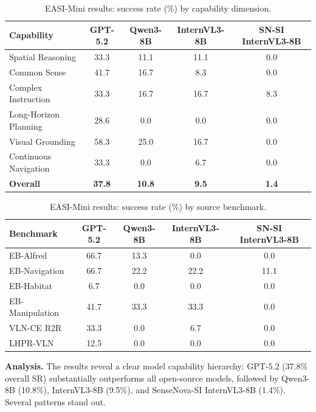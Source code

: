 \documentclass[
hf,
]{confart}
\begin{document}
\begin{table}[htbp]
\centering
\caption{EASI-Mini results: success rate (\%) by capability dimension.}
\label{tab:easimini_capability}
\renewcommand{\arraystretch}{1.1}
\begin{tabular}{lcccc}
\toprule
\textbf{Capability} & \textbf{GPT-5.2} & \textbf{Qwen3-8B} & \textbf{InternVL3-8B} & \textbf{SN-SI InternVL3-8B} \\
\midrule
Spatial Reasoning & 33.3 & 11.1 & 11.1 & 0.0 \\
Common Sense & 41.7 & 16.7 & 8.3 & 0.0 \\
Complex Instruction & 33.3 & 16.7 & 16.7 & 8.3 \\
Long-Horizon Planning & 28.6 & 0.0 & 0.0 & 0.0 \\
Visual Grounding & 58.3 & 25.0 & 16.7 & 0.0 \\
Continuous Navigation & 33.3 & 0.0 & 6.7 & 0.0 \\
\midrule
\textbf{Overall} & \textbf{37.8} & \textbf{10.8} & \textbf{9.5} & \textbf{1.4} \\
\bottomrule
\end{tabular}
\end{table}

\begin{table}[htbp]
\centering
\caption{EASI-Mini results: success rate (\%) by source benchmark.}
\label{tab:easimini_benchmark}
\renewcommand{\arraystretch}{1.1}
\begin{tabular}{lcccc}
\toprule
\textbf{Benchmark} & \textbf{GPT-5.2} & \textbf{Qwen3-8B} & \textbf{InternVL3-8B} & \textbf{SN-SI InternVL3-8B} \\
\midrule
EB-Alfred & 66.7 & 13.3 & 0.0 & 0.0 \\
EB-Navigation & 66.7 & 22.2 & 22.2 & 11.1 \\
EB-Habitat & 6.7 & 0.0 & 0.0 & 0.0 \\
EB-Manipulation & 41.7 & 33.3 & 33.3 & 0.0 \\
VLN-CE R2R & 33.3 & 0.0 & 6.7 & 0.0 \\
LHPR-VLN & 12.5 & 0.0 & 0.0 & 0.0 \\
\bottomrule
\end{tabular}
\end{table}


\textbf{Analysis.} The results reveal a clear model capability hierarchy: GPT-5.2 (37.8\% overall SR) substantially outperforms all open-source models, followed by Qwen3-8B (10.8\%), InternVL3-8B (9.5\%), and SenseNova-SI InternVL3-8B (1.4\%). Several patterns stand out.
\end{document}
